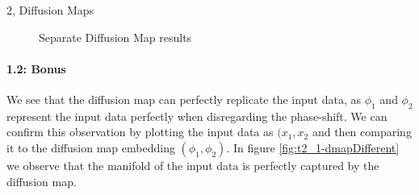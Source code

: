 \begin{task}{2, Diffusion Maps}
\begin{figure}[H]
\centering
{}
\caption{Separate Diffusion Map results}
\label{fig:t2_1-dmapSeparate}
\end{figure}

\paragraph{1.2: Bonus}
We see that the diffusion map can perfectly replicate the input data, as $\phi_1$ and $\phi_2$ represent the input data perfectly when disregarding the phase-shift. We can confirm this observation by plotting the input data as $(x_1 ,x_2$ and then comparing it to the diffusion map embedding $(\phi_1 ,\phi_2 )$. In figure \ref{fig:t2_1-dmapDifferent} we observe that the manifold of the input data is perfectly captured by the diffusion map.


\end{task}
